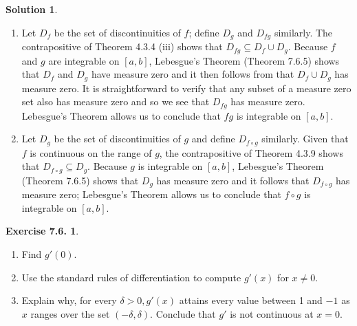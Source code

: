 \documentclass[12pt]{article}
\theoremstyle{definition}
\theoremstyle{exercise}
\newtheorem{exercise}{Exercise 7.6.}
\theoremstyle{solution}
\newtheorem*{solution}{Solution}
\begin{document}
\begin{solution}
    \begin{enumerate}
        \item Let \( D_f \) be the set of discontinuities of \( f \); define \( D_g \) and \( D_{fg} \) similarly. The contrapositive of Theorem 4.3.4 (iii) shows that \( D_{fg} \subseteq D_f \cup D_g \). Because \( f \) and \( g \) are integrable on \( [a, b] \), Lebesgue's Theorem (Theorem 7.6.5) shows that \( D_f \) and \( D_g \) have measure zero and it then follows from  that \( D_f \cup D_g \) has measure zero. It is straightforward to verify that any subset of a measure zero set also has measure zero and so we see that \( D_{fg} \) has measure zero. Lebesgue's Theorem allows us to conclude that \( fg \) is integrable on \( [a, b] \).

        \item Let \( D_g \) be the set of discontinuities of \( g \) and define \( D_{f \circ g} \) similarly. Given that \( f \) is continuous on the range of \( g \), the contrapositive of Theorem 4.3.9 shows that \( D_{f \circ g} \subseteq D_g \). Because \( g \) is integrable on \( [a, b] \), Lebesgue's Theorem (Theorem 7.6.5) shows that \( D_g \) has measure zero and it follows that \( D_{f \circ g} \) has measure zero; Lebesgue's Theorem allows us to conclude that \( f \circ g \) is integrable on \( [a, b] \).
    \end{enumerate}
\end{solution}

\begin{exercise}
\label{ex:14}
    \begin{enumerate}
        \item Find \( g'(0) \).

        \item Use the standard rules of differentiation to compute \( g'(x) \) for \( x \neq 0 \).

        \item Explain why, for every \( \delta > 0, g'(x) \) attains every value between 1 and \( -1 \) as \( x \) ranges over the set \( (-\delta, \delta) \). Conclude that \( g' \) is not continuous at \( x = 0 \).
    \end{enumerate}
\end{exercise}
\end{document}
